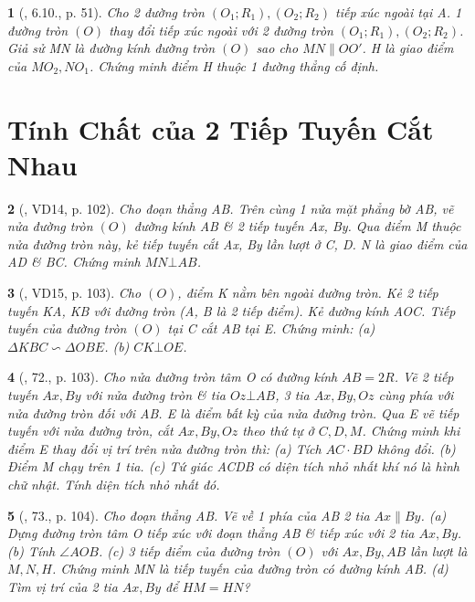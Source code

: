 \documentclass{article}
\newtheorem{baitoan}{}
\begin{document}
\begin{baitoan}[\cite{TLCT_THCS_Toan_9_hinh_hoc}, 6.10., p. 51]
	Cho 2 đường tròn $(O_1;R_1),(O_2;R_2)$ tiếp xúc ngoài tại A. 1 đường tròn $(O)$ thay đổi tiếp xúc ngoài với 2 đường tròn $(O_1;R_1),(O_2;R_2)$. Giả sử MN là đường kính đường tròn $(O)$ sao cho $MN\parallel OO'$. H là giao điểm của $MO_2,NO_1$. Chứng minh điểm H thuộc 1 đường thẳng cố định.
\end{baitoan}


\section{Tính Chất của 2 Tiếp Tuyến Cắt Nhau}

\begin{baitoan}[\cite{Binh_Toan_9_tap_1}, VD14, p. 102]
	Cho đoạn thẳng AB. Trên cùng 1 nửa mặt phẳng bờ AB, vẽ nửa đường tròn $(O)$ đường kính AB \& 2 tiếp tuyến Ax, By. Qua điểm M thuộc nửa đường tròn này, kẻ tiếp tuyến cắt Ax, By lần lượt ở C, D. N là giao điểm của AD \& BC. Chứng minh $MN\bot AB$.
\end{baitoan}

\begin{baitoan}[\cite{Binh_Toan_9_tap_1}, VD15, p. 103]
	Cho $(O)$, điểm K nằm bên ngoài đường tròn. Kẻ 2 tiếp tuyến KA, KB với đường tròn (A, B là 2 tiếp điểm). Kẻ đường kính AOC. Tiếp tuyến của đường tròn $(O)$ tại C cắt AB tại E. Chứng minh: (a) $\Delta KBC\backsim\Delta OBE$. (b) $CK\bot OE$.
\end{baitoan}

\begin{baitoan}[\cite{Binh_Toan_9_tap_1}, 72., p. 103]
	Cho nửa đường tròn tâm O có đường kính $AB = 2R$. Vẽ 2 tiếp tuyến $Ax,By$ với nửa đường tròn \& tia $Oz\bot AB$, 3 tia $Ax,By,Oz$ cùng phía với nửa đường tròn đối với AB. E là điểm bất kỳ của nửa đường tròn. Qua E vẽ tiếp tuyến với nửa đường tròn, cắt $Ax,By,Oz$ theo thứ tự ở $C,D,M$. Chứng minh khi điểm E thay đổi vị trí trên nửa đường tròn thì: (a) Tích $AC\cdot BD$ không đổi. (b) Điểm M chạy trên 1 tia. (c) Tứ giác ACDB có diện tích nhỏ nhất khí nó là hình chữ nhật. Tính diện tích nhỏ nhất đó.
\end{baitoan}

\begin{baitoan}[\cite{Binh_Toan_9_tap_1}, 73., p. 104]
	Cho đoạn thẳng AB. Vẽ về 1 phía của AB 2 tia $Ax\parallel By$. (a) Dựng đường tròn tâm O tiếp xúc với đoạn thẳng AB \& tiếp xúc với 2 tia $Ax,By$. (b) Tính $\angle{AOB}$. (c) 3 tiếp điểm của đường tròn $(O)$ với $Ax,By,AB$ lần lượt là $M,N,H$. Chứng minh MN là tiếp tuyến của đường tròn có đường kính AB. (d) Tìm vị trí của 2 tia $Ax,By$ để $HM = HN$?
\end{baitoan}
\end{document}
